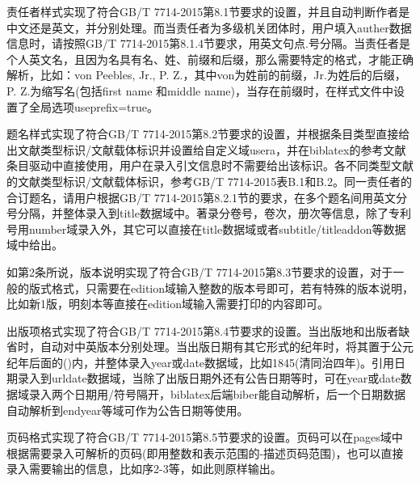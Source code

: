 \documentclass[11pt]{article} %
\begin{document}
\begin{property}{}{}
责任者样式实现了符合GB/T 7714-2015第8.1节要求的设置，并且自动判断作者是中文还是英文，并分别处理。而当责任者为多级机关团体时，用户填入auther数据信息时，请按照GB/T 7714-2015第8.1.4节要求，用英文句点.号分隔。当责任者是个人英文名，且因为名具有名、姓、前缀和后缀，那么需要特定的格式，才能正确解析，比如：von Peebles, Jr., P. Z.，其中von为姓前的前缀，Jr.为姓后的后缀，P. Z.为缩写名(包括first name 和middle name)，当存在前缀时，在样式文件中设置了全局选项useprefix=true。
\end{property}

\begin{property}{}{}
题名样式实现了符合GB/T 7714-2015第8.2节要求的设置，并根据条目类型直接给出文献类型标识/文献载体标识并设置给自定义域usera，并在biblatex的参考文献条目驱动中直接使用，用户在录入引文信息时不需要给出该标识。各不同类型文献的文献类型标识/文献载体标识，参考GB/T 7714-2015表B.1和B.2。同一责任者的合订题名，请用户根据GB/T 7714-2015第8.2.1节的要求，在多个题名间用英文分号分隔，并整体录入到title数据域中。著录分卷号，卷次，册次等信息，除了专利号用number域录入外，其它可以直接在title数据域或者subtitle/titleaddon等数据域中给出。
\end{property}

\begin{property}{}{}
如第2条所说，版本说明实现了符合GB/T 7714-2015第8.3节要求的设置，对于一般的版式格式，只需要在edition域输入整数的版本号即可，若有特殊的版本说明，比如新1版，明刻本等直接在edition域输入需要打印的内容即可。
\end{property}

\begin{property}{}{}
出版项格式实现了符合GB/T 7714-2015第8.4节要求的设置。当出版地和出版者缺省时，自动对中英版本分别处理。当出版日期有其它形式的纪年时，将其置于公元纪年后面的()内，并整体录入year或date数据域，比如1845(清同治四年)。引用日期录入到urldate数据域，当除了出版日期外还有公告日期等时，可在year或date数据域录入两个日期用/符号隔开，biblatex后端biber能自动解析，后一个日期数据自动解析到endyear等域可作为公告日期等使用。
\end{property}


\begin{property}{}{}
页码格式实现了符合GB/T 7714-2015第8.5节要求的设置。页码可以在pages域中根据需要录入可解析的页码(即用整数和表示范围的-描述页码范围)，也可以直接录入需要输出的信息，比如序2-3等，如此则原样输出。
\end{property}
\end{document}
